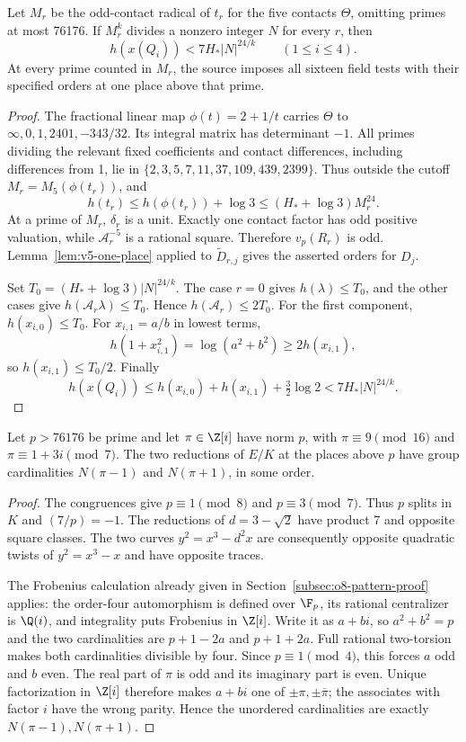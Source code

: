 \begin{lemma}\label{lem:v5-height-transfer}
Let $M_r$ be the odd-contact radical of $t_r$ for the five contacts
$\Theta$, omitting primes at most 76176. If $M_r^k$ divides a
nonzero integer $N$ for every $r$, then
\[
 h(x(Q_i))<7H_*|N|^{24/k}\qquad(1\le i\le4).
\]
At every prime counted in $M_r$, the source imposes all sixteen
field tests with their specified orders at one place above that prime.
\end{lemma}
\begin{proof}
The fractional linear map $\phi(t)=2+1/t$ carries $\Theta$ to
$\infty,0,1,2401,-343/32$. Its integral matrix has determinant $-1$.
All primes dividing the relevant fixed coefficients and contact
differences, including differences from 1, lie in
$\{2,3,5,7,11,37,109,439,2399\}$. Thus outside the cutoff
$M_r=M_5(\phi(t_r))$, and
\[
 h(t_r)\le h(\phi(t_r))+\log3
       \le(H_*+\log3)M_r^{24}.
\]
At a prime of $M_r$, $\delta_r$ is a unit. Exactly one contact
factor has odd positive valuation, while $\mathcal A_r^{-5}$ is
a rational square. Therefore $v_p(R_r)$ is odd.
Lemma~\ref{lem:v5-one-place} applied to $\widetilde D_{r,j}$ gives
the asserted orders for $D_j$.

Set $T_0=(H_*+\log3)|N|^{24/k}$. The case $r=0$ gives
$h(\lambda)\le T_0$, and the other cases give
$h(\mathcal A_r\lambda)\le T_0$. Hence
$h(\mathcal A_r)\le2T_0$. For the first component,
$h(x_{i,0})\le T_0$. For $x_{i,1}=a/b$ in lowest terms,
\[
 h(1+x_{i,1}^2)=\log(a^2+b^2)\ge2h(x_{i,1}),
\]
so $h(x_{i,1})\le T_0/2$. Finally
\[
 h(x(Q_i))\le h(x_{i,0})+h(x_{i,1})+\tfrac32\log2
 <7H_*|N|^{24/k}.
\]
\end{proof}

\begin{lemma}
\label{lem:v5-two-reductions}
Let $p>76176$ be prime and let $\pi\in\Z[i]$ have norm $p$, with
$\pi\equiv9\pmod{16}$ and $\pi\equiv1+3i\pmod7$.
The two reductions of $E/K$ at the places above $p$ have group
cardinalities $N(\pi-1)$ and $N(\pi+1)$, in some order.
\end{lemma}
\begin{proof}
The congruences give $p\equiv1\pmod8$ and $p\equiv3\pmod7$.
Thus $p$ splits in $K$ and $(7/p)=-1$. The reductions of
$d=3-\sqrt2$ have product 7 and opposite square classes. The two
curves $y^2=x^3-d^2x$ are consequently opposite quadratic twists
of $y^2=x^3-x$ and have opposite traces.

The Frobenius calculation already given in
Section~\ref{subsec:o8-pattern-proof} applies: the order-four
automorphism is defined over $\F_p$, its rational centralizer is
$\Q(i)$, and integrality puts Frobenius in $\Z[i]$.
Write it as $a+bi$, so $a^2+b^2=p$ and the two cardinalities are
$p+1-2a$ and $p+1+2a$. Full rational two-torsion makes both
cardinalities divisible by four. Since $p\equiv1\pmod4$, this
forces $a$ odd and $b$ even. The real part of $\pi$ is odd and its
imaginary part is even. Unique factorization in $\Z[i]$ therefore
makes $a+bi$ one of $\pm\pi,\pm\overline\pi$; the associates
with factor $i$ have the wrong parity. Hence the unordered
cardinalities are exactly $N(\pi-1),N(\pi+1)$.
\end{proof}

